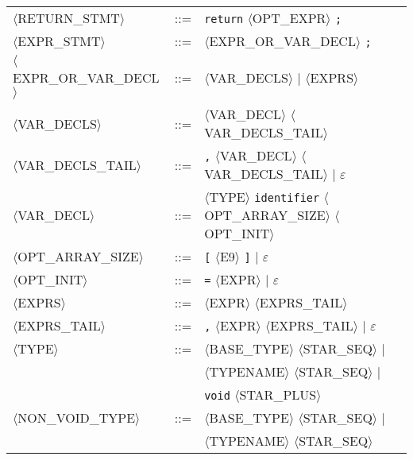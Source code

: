 \begin{footnotesize}
\begin{longtable}{>{\raggedright\arraybackslash}p{4cm}@{\ }>{\raggedright\arraybackslash}p{1.5cm}@{\ }>{\raggedright\arraybackslash}p{8.5cm}}
      $\langle$RETURN\_STMT$\rangle$ & ::= & \texttt{return} $\langle$OPT\_EXPR$\rangle$ \texttt{;} \\
      
      $\langle$EXPR\_STMT$\rangle$ & ::= & $\langle$EXPR\_OR\_VAR\_DECL$\rangle$ \texttt{;} \\
      
      $\langle$EXPR\_OR\_VAR\_DECL$\rangle$ & ::= & $\langle$VAR\_DECLS$\rangle$ $\mid$ $\langle$EXPRS$\rangle$ \\
      
      $\langle$VAR\_DECLS$\rangle$ & ::= & $\langle$VAR\_DECL$\rangle$ $\langle$VAR\_DECLS\_TAIL$\rangle$ \\
      
      $\langle$VAR\_DECLS\_TAIL$\rangle$ & ::= & \texttt{,} $\langle$VAR\_DECL$\rangle$ $\langle$VAR\_DECLS\_TAIL$\rangle$ $\mid$ $\varepsilon$ \\
      
      $\langle$VAR\_DECL$\rangle$ & ::= & $\langle$TYPE$\rangle$ \texttt{identifier} $\langle$OPT\_ARRAY\_SIZE$\rangle$ $\langle$OPT\_INIT$\rangle$ \\
      
      $\langle$OPT\_ARRAY\_SIZE$\rangle$ & ::= & \texttt{[} $\langle$E9$\rangle$ \texttt{]} $\mid$ $\varepsilon$ \\
      
      $\langle$OPT\_INIT$\rangle$ & ::= & \texttt{=} $\langle$EXPR$\rangle$ $\mid$ $\varepsilon$ \\
      
      $\langle$EXPRS$\rangle$ & ::= & $\langle$EXPR$\rangle$ $\langle$EXPRS\_TAIL$\rangle$ \\
      
      $\langle$EXPRS\_TAIL$\rangle$ & ::= & \texttt{,} $\langle$EXPR$\rangle$ $\langle$EXPRS\_TAIL$\rangle$ $\mid$ $\varepsilon$ \\
      
      $\langle$TYPE$\rangle$ & ::= & $\langle$BASE\_TYPE$\rangle$ $\langle$STAR\_SEQ$\rangle$ $\mid$ \\
      & & $\langle$TYPENAME$\rangle$ $\langle$STAR\_SEQ$\rangle$ $\mid$ \\
      & & \texttt{void} $\langle$STAR\_PLUS$\rangle$ \\
      
      $\langle$NON\_VOID\_TYPE$\rangle$ & ::= & $\langle$BASE\_TYPE$\rangle$ $\langle$STAR\_SEQ$\rangle$ $\mid$ \\
      & & $\langle$TYPENAME$\rangle$ $\langle$STAR\_SEQ$\rangle$ \\
      

\end{longtable}
\end{footnotesize}
